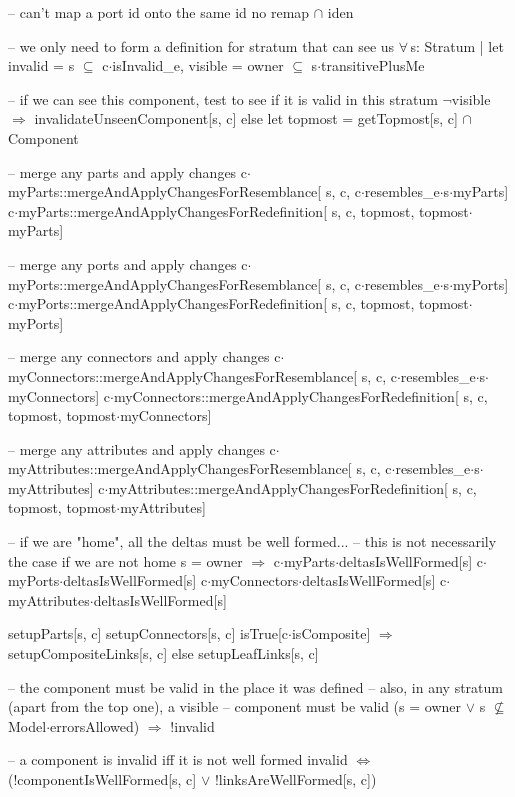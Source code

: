 {{{      -- can't map a port id onto the same id
      no remap $\cap$ iden
    }
    
    -- we only need to form a definition for stratum that can see us
    $\forall\,$s: Stratum |
    let
      invalid = s $\subseteq$ c$\cdot$isInvalid_e,
      visible = owner $\subseteq$ s$\cdot$transitivePlusMe
    {
      -- if we can see this component, test to see if it is valid in this stratum
      $\neg$visible $\Longrightarrow$
        invalidateUnseenComponent[s, c]
      else
      let topmost = getTopmost[s, c] $\cap$ Component
      {  
        -- merge any parts and apply changes
        c$\cdot$myParts::mergeAndApplyChangesForResemblance[
          s, c, c$\cdot$resembles_e$\cdot$s$\cdot$myParts]
        c$\cdot$myParts::mergeAndApplyChangesForRedefinition[
          s, c, topmost, topmost$\cdot$myParts]
          
        -- merge any ports and apply changes
        c$\cdot$myPorts::mergeAndApplyChangesForResemblance[
          s, c, c$\cdot$resembles_e$\cdot$s$\cdot$myPorts]
        c$\cdot$myPorts::mergeAndApplyChangesForRedefinition[
          s, c, topmost, topmost$\cdot$myPorts]
          
        -- merge any connectors and apply changes
        c$\cdot$myConnectors::mergeAndApplyChangesForResemblance[
          s, c, c$\cdot$resembles_e$\cdot$s$\cdot$myConnectors]
        c$\cdot$myConnectors::mergeAndApplyChangesForRedefinition[
          s, c, topmost, topmost$\cdot$myConnectors]
          
        -- merge any attributes and apply changes
        c$\cdot$myAttributes::mergeAndApplyChangesForResemblance[
          s, c, c$\cdot$resembles_e$\cdot$s$\cdot$myAttributes]
        c$\cdot$myAttributes::mergeAndApplyChangesForRedefinition[
          s, c, topmost, topmost$\cdot$myAttributes]
          
        -- if we are "home", all the deltas must be well formed...
        -- this is not necessarily the case if we are not home
        s = owner $\Longrightarrow$
        {
          c$\cdot$myParts$\cdot$deltasIsWellFormed[s]
          c$\cdot$myPorts$\cdot$deltasIsWellFormed[s]
          c$\cdot$myConnectors$\cdot$deltasIsWellFormed[s]
          c$\cdot$myAttributes$\cdot$deltasIsWellFormed[s]
        }
        
        setupParts[s, c]
        setupConnectors[s, c]
        isTrue[c$\cdot$isComposite] $\Longrightarrow$
          setupCompositeLinks[s, c]
        else
          setupLeafLinks[s, c]
        
        -- the component must be valid in the place it was defined
        -- also, in any stratum (apart from the top one), a visible
        -- component must be valid
        (s = owner $\vee$ s $\not\subseteq$ Model$\cdot$errorsAllowed) $\Longrightarrow$ !invalid
        
        -- a component is invalid iff it is not well formed
        invalid $\Longleftrightarrow$
          (!componentIsWellFormed[s, c] $\vee$ !linksAreWellFormed[s, c])
      }
    }
  }
}

